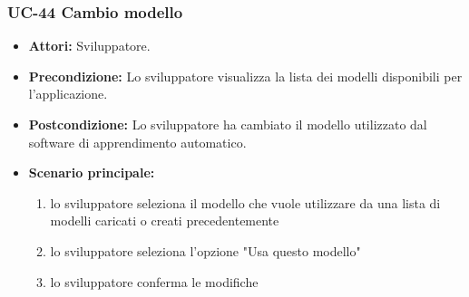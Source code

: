 	\subsubsection{UC-44 Cambio modello}
	\begin{itemize}					
			\item \textbf{Attori:} Sviluppatore.
			\item \textbf{Precondizione:} Lo sviluppatore visualizza la lista dei modelli disponibili per l'applicazione.
			\item \textbf{Postcondizione:} Lo sviluppatore ha cambiato il modello utilizzato dal software di apprendimento automatico.
			\item \textbf{Scenario principale:}
				\begin{enumerate}
					\item lo sviluppatore seleziona il modello che vuole utilizzare da una lista di modelli caricati o creati precedentemente
					\item lo sviluppatore seleziona l'opzione "Usa questo modello"
					\item lo sviluppatore conferma le modifiche
				\end{enumerate}	
		\end{itemize}		
	